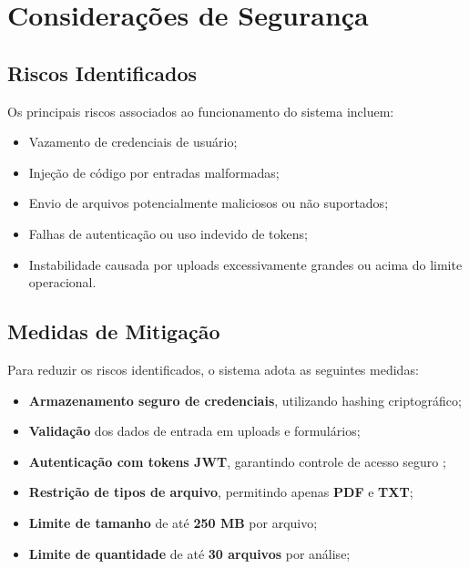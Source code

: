 \section{Considerações de Segurança}

\subsection{Riscos Identificados}

Os principais riscos associados ao funcionamento do sistema incluem:

\begin{itemize}
    \item Vazamento de credenciais de usuário;
    \item Injeção de código por entradas malformadas;
    \item Envio de arquivos potencialmente maliciosos ou não suportados;
    \item Falhas de autenticação ou uso indevido de tokens;
    \item Instabilidade causada por uploads excessivamente grandes ou acima do limite operacional.
\end{itemize}

\subsection{Medidas de Mitigação}

Para reduzir os riscos identificados, o sistema adota as seguintes medidas:

\begin{itemize}
    \item \textbf{Armazenamento seguro de credenciais}, utilizando hashing criptográfico;
    \item \textbf{Validação} dos dados de entrada em uploads e formulários;
    \item \textbf{Autenticação com tokens JWT}, garantindo controle de acesso seguro \cite{jwt_rfc7519_2015};
    \item \textbf{Restrição de tipos de arquivo}, permitindo apenas \textbf{PDF} e \textbf{TXT};
    \item \textbf{Limite de tamanho} de até \textbf{250 MB} por arquivo;
    \item \textbf{Limite de quantidade} de até \textbf{30 arquivos} por análise;
\end{itemize}

